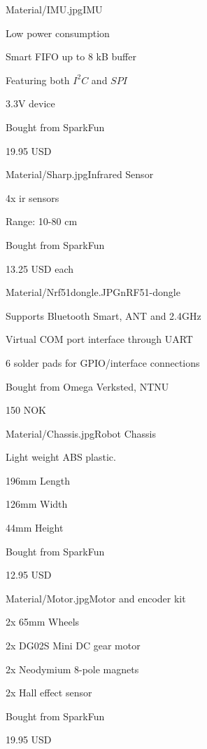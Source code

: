 \begin{material}{Material/IMU.jpg}{IMU \cite{sparkfun} }
\item Low power consumption
\item Smart FIFO up to 8 kB buffer
\item Featuring both $I^2C$ and $SPI$
\item 3.3V device
\item Bought from SparkFun
\item 19.95 USD
\end{material}
\newpage
{}
\begin{material}{Material/Sharp.jpg}{Infrared Sensor \cite{sparkfun} }
\item 4x \acrfull{ir} sensors
\item Range: 10-80 cm
\item Bought from SparkFun
\item 13.25 USD each
\end{material}

\begin{material}{Material/Nrf51dongle.JPG}{nRF51-dongle \cite{nrf51Dongle} }
\item Supports Bluetooth Smart, ANT and 2.4GHz
\item Virtual COM port interface through UART
\item 6 solder pads for GPIO/interface connections
\item Bought from Omega Verksted, NTNU
\item 150 NOK
\end{material}

\begin{material}{Material/Chassis.jpg}{Robot Chassis \cite{sparkfun} }
\item Light weight ABS plastic.
\item 196mm Length 
\item 126mm Width 
\item 44mm Height
\item Bought from SparkFun
\item 12.95 USD
\end{material}

\newpage
{}
\begin{material}{Material/Motor.jpg}{Motor and encoder kit \cite{sparkfun} }
\item 2x 65mm Wheels
\item 2x DG02S Mini DC gear motor
\item 2x Neodymium 8-pole magnets
\item 2x Hall effect sensor
\item Bought from SparkFun
\item 19.95 USD
\end{material}

